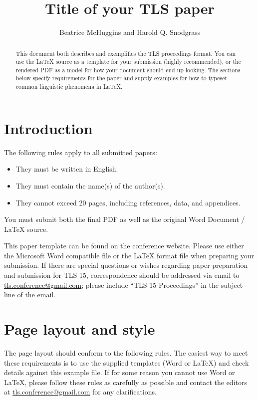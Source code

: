 \documentclass{tls}
\title{Title of your TLS paper}
\author{Beatrice McHuggins and Harold Q. Snodgrass}
\begin{document}
\maketitle
\thispagestyle{empty}

\begin{abstract}
  This document both describes and exemplifies the TLS proceedings format. You can use the \LaTeX{} source as a template for your submission (highly recommended), or the rendered PDF as a model for how your document should end up looking. The sections below specify requirements for the paper and supply examples for how to typeset common linguistic phenomena in \LaTeX.
\end{abstract}

\section{Introduction}

The following rules apply to all submitted papers:

\begin{itemize}
  \item They must be written in English.
  \item They must contain the name(s) of the author(s).
  \item They cannot exceed 20 pages, including references, data, and appendices.
\end{itemize}

\noindent
You must submit both the final PDF as well as the original Word Document / \LaTeX{} source.

This paper template can be found on the conference website. Please use either the Microsoft Word compatible file or the \LaTeX{} format file when preparing your submission. If there are special questions or wishes regarding paper preparation and submission for TLS 15, correspondence should be addressed via email to \url{tls.conference@gmail.com}; please include ``TLS 15 Proceedings'' in the subject line of the email.


\section{Page layout and style}

The page layout should conform to the following rules. The easiest way to meet these requirements is to use the supplied templates (Word or \LaTeX) and check details against this example file. If for some reason you cannot use Word or \LaTeX, please follow these rules as carefully as possible and contact the editors at \url{tls.conference@gmail.com} for any clarifications.
\end{document}
